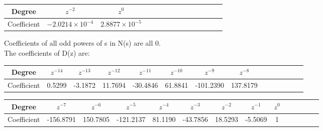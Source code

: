 \documentclass{article}
\begin{document}
\vspace{-10mm}

\begin{table}[H]
		\begin{center}
		\begin{tabular}{|c|c|c|c|c|c|c|c|c|c|c|c|c|c|}
			\hline
			Degree  & $z^{-2}$ & $z^0$  \\
			
			\hline
                Coefficient & $-2.0214 \times 10^{-4}$ & $2.8877 \times 10^{-5}$ \\
                \hline
            
		\end{tabular}
		\end{center}
\end{table}

Coefficients of all odd powers of s in N(s) are all 0.\\


The coefficients of D(z) are:

\begin{table}[H]
		\begin{center}
		\begin{tabular}{|c|c|c|c|c|c|c|c|c|c|c|c|c|c|}
			\hline
			Degree & $z^{-14}$  & $z^{-13}$ & $z^{-12}$ & $z^{-11}$ & $z^{-10}$ & $z^{-9}$ & $z^{-8}$ \\
			
			\hline
                Coefficient & 0.5299 & -3.1872 & 11.7694 & -30.4846 & 61.8841 & -101.2390 & 137.8179 \\
                \hline
            
		\end{tabular}
		\end{center}
\end{table}

\vspace{-10mm}

\begin{table}[H]
		\begin{center}
		\begin{tabular}{|c|c|c|c|c|c|c|c|c|c|c|c|c|c|}
			\hline
			Degree &  $z^{-7}$ & $z^{-6}$  & $z^{-5}$ & $z^{-4}$ & $z^{-3}$ & $z^{-2}$ & $z^{-1}$ & $z^0$ \\
			
			\hline
                Coefficient & -156.8791 & 150.7805 & -121.2137 & 81.1190 & -43.7856 & 18.5293 & -5.5069 & 1 \\
                \hline
            
		\end{tabular}
		\end{center}
\end{table}
\end{document}
